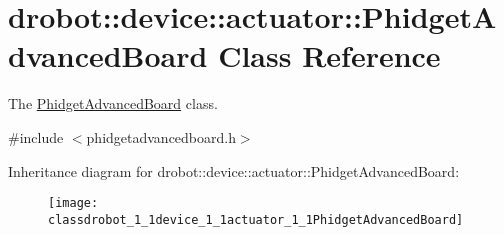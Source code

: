\hypertarget{classdrobot_1_1device_1_1actuator_1_1PhidgetAdvancedBoard}{\section{drobot\-:\-:device\-:\-:actuator\-:\-:Phidget\-Advanced\-Board Class Reference}
\label{classdrobot_1_1device_1_1actuator_1_1PhidgetAdvancedBoard}
}


The \hyperlink{classdrobot_1_1device_1_1actuator_1_1PhidgetAdvancedBoard}{Phidget\-Advanced\-Board} class.  




{\ttfamily \#include $<$phidgetadvancedboard.\-h$>$}

Inheritance diagram for drobot\-:\-:device\-:\-:actuator\-:\-:Phidget\-Advanced\-Board\-:\begin{figure}[H]
\begin{center}
\leavevmode
\texttt{[image: classdrobot\_1\_1device\_1\_1actuator\_1\_1PhidgetAdvancedBoard]}
\end{center}
\end{figure}

